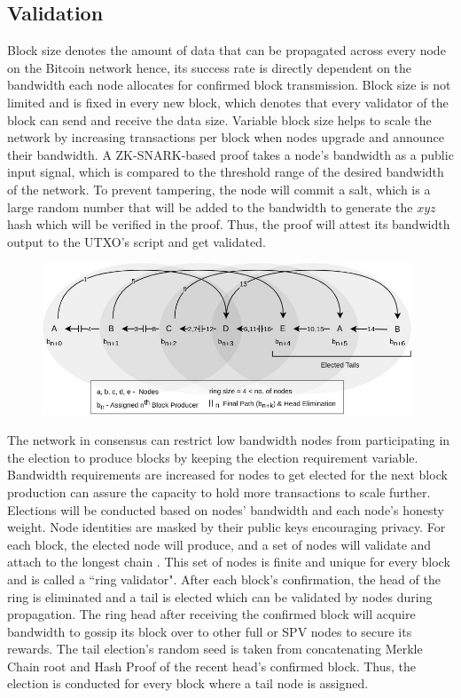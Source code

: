 \documentclass[a4paper,	10pt]{extarticle}
\begin{document}
\subsection{Validation}
Block size denotes the amount of data that can be propagated across every node on the Bitcoin network hence, its success rate is directly dependent on the bandwidth each node allocates for confirmed block transmission. Block size is not limited and is fixed in every new block, which denotes that every validator of the block can send and receive the data size. Variable block size helps to scale the network by increasing transactions per block when nodes upgrade and announce their bandwidth. A ZK-SNARK-based proof takes a node’s bandwidth as a public input signal, which is compared to the threshold range of the desired bandwidth of the network. To prevent tampering, the node will commit a salt, which is a large random number that will be added to the bandwidth to generate the $xyz$ hash which will be verified in the proof. Thus, the proof will attest its bandwidth output to the UTXO’s script and get validated.\\
\begin{figure}[H]
\begin{center}
\includegraphics[width=11cm]{ring}
\end{center}
\end{figure}
The network in consensus can restrict low bandwidth nodes from participating in the election to produce blocks by keeping the election requirement variable. Bandwidth requirements are increased for nodes to get elected for the next block production can assure the capacity to hold more transactions to scale further. Elections will be conducted based on nodes' bandwidth and each node's honesty weight. Node identities are masked by their public keys encouraging privacy. For each block, the elected node will produce, and a set of nodes will validate and attach to the longest chain \cite{nakamoto2008bitcoin}. This set of nodes is finite and unique for every block and is called a ``ring validator". After each block's confirmation, the head of the ring is eliminated and a tail is elected which can be validated by nodes during propagation. The ring head after receiving the confirmed block will acquire bandwidth to gossip its block over to other full or SPV nodes to secure its rewards. The tail election's random seed is taken from concatenating Merkle Chain root and Hash Proof \cite{yakovenko2018solana} of the recent head's confirmed block. Thus, the election is conducted for every block where a tail node is assigned.
\end{document}
